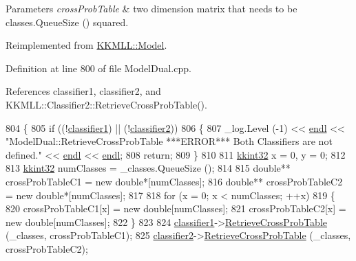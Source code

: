 \begin{DoxyParams}{Parameters}
{\em cross\+Prob\+Table} & two dimension matrix that needs to be classes.\+Queue\+Size () squared. \\
\hline
\end{DoxyParams}


Reimplemented from \hyperlink{class_k_k_m_l_l_1_1_model_a9e809d2562e49ab6842344442be94362}{K\+K\+M\+L\+L\+::\+Model}.



Definition at line 800 of file Model\+Dual.\+cpp.



References classifier1, classifier2, and K\+K\+M\+L\+L\+::\+Classifier2\+::\+Retrieve\+Cross\+Prob\+Table().


\begin{DoxyCode}
804 \{
805   \textcolor{keywordflow}{if}  ((!\hyperlink{class_k_k_m_l_l_1_1_model_dual_a702b5e302cc05ab6cdc3ee4ae8115622}{classifier1})  ||  (!\hyperlink{class_k_k_m_l_l_1_1_model_dual_a18ed538fadc0cb3eebdb9175ccce22e2}{classifier2}))
806   \{
807     \_log.Level (-1) << \hyperlink{namespace_k_k_b_ad1f50f65af6adc8fa9e6f62d007818a8}{endl} << \textcolor{stringliteral}{"ModelDual::RetrieveCrossProbTable   ***ERROR***      Both Classifiers
       are not defined."} << \hyperlink{namespace_k_k_b_ad1f50f65af6adc8fa9e6f62d007818a8}{endl} << \hyperlink{namespace_k_k_b_ad1f50f65af6adc8fa9e6f62d007818a8}{endl};
808     \textcolor{keywordflow}{return};
809   \}
810 
811   \hyperlink{namespace_k_k_b_a8fa4952cc84fda1de4bec1fbdd8d5b1b}{kkint32} x = 0, y = 0;
812 
813   \hyperlink{namespace_k_k_b_a8fa4952cc84fda1de4bec1fbdd8d5b1b}{kkint32} numClasses = \_classes.QueueSize ();
814 
815   \textcolor{keywordtype}{double}**  crossProbTableC1 = \textcolor{keyword}{new} \textcolor{keywordtype}{double}*[numClasses];
816   \textcolor{keywordtype}{double}**  crossProbTableC2 = \textcolor{keyword}{new} \textcolor{keywordtype}{double}*[numClasses];
817 
818   \textcolor{keywordflow}{for}  (x = 0;  x < numClasses;  ++x)
819   \{
820     crossProbTableC1[x] = \textcolor{keyword}{new} \textcolor{keywordtype}{double}[numClasses];
821     crossProbTableC2[x] = \textcolor{keyword}{new} \textcolor{keywordtype}{double}[numClasses];
822   \}
823 
824   \hyperlink{class_k_k_m_l_l_1_1_model_dual_a702b5e302cc05ab6cdc3ee4ae8115622}{classifier1}->\hyperlink{class_k_k_m_l_l_1_1_classifier2_a9fdcd344817bbcff82642f71719d60ee}{RetrieveCrossProbTable} (\_classes, crossProbTableC1);
825   \hyperlink{class_k_k_m_l_l_1_1_model_dual_a18ed538fadc0cb3eebdb9175ccce22e2}{classifier2}->\hyperlink{class_k_k_m_l_l_1_1_classifier2_a9fdcd344817bbcff82642f71719d60ee}{RetrieveCrossProbTable} (\_classes, crossProbTableC2);

\end{DoxyCode}
